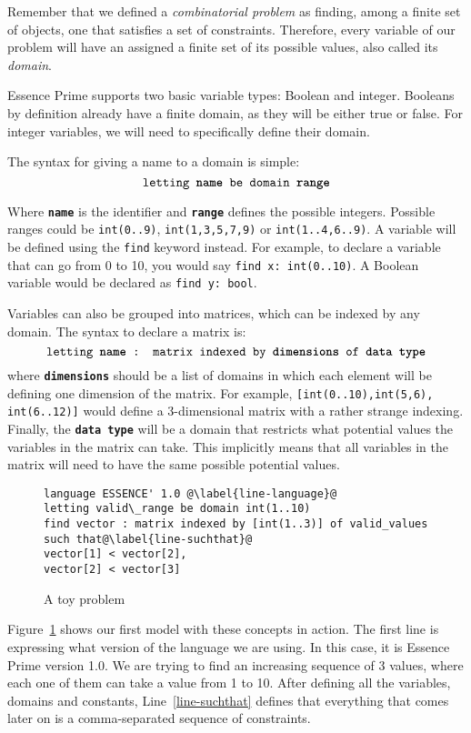 Remember that we defined a \emph{combinatorial problem} as finding, among a
finite set of objects, one that satisfies a set of constraints.  Therefore,
every variable of our problem will have an assigned a finite set
of its possible values, also called its \emph{domain}. 

Essence Prime supports two basic variable types: Boolean and integer. Booleans
by definition already have a finite domain, as they will be either true or false.
For integer variables, we will need to specifically define their domain.

The syntax for giving a name to a domain is simple:
$$\text{\texttt{letting \textbf{name} be domain \textbf{range}}}$$

Where \texttt{\textbf{name}} is the identifier and \texttt{\textbf{range}}
defines the possible integers. Possible ranges could be \texttt{int(0..9)},
\texttt{int(1,3,5,7,9)} or \texttt{int(1..4,6..9)}.  A variable will be defined
using the \texttt{find} keyword instead. For example, to declare a variable
that can go from 0 to 10, you would say \texttt{find x: int(0..10)}. A Boolean
variable would be declared as \texttt{find y: bool}.

Variables can also be grouped into matrices, which can be indexed by any domain.
The syntax to declare a matrix is:
$$\text{\texttt{letting \textbf{name} : matrix indexed by \textbf{dimensions} of \textbf{data type}}}$$
where \texttt{\textbf{dimensions}} should be a list of domains in which each
element will be defining one dimension of the matrix. For example,
\texttt{[int(0..10),int(5,6), int(6..12)]} would define a 3-dimensional matrix
with a rather strange indexing. Finally, the \texttt{\textbf{data type}} will
be a domain that restricts what potential values the variables in the matrix
can take.  This implicitly means that all variables in the matrix will need to
have the same possible potential values.

\begin{figure}
\begin{lstlisting}
language ESSENCE' 1.0 @\label{line-language}@
letting valid\_range be domain int(1..10)
find vector : matrix indexed by [int(1..3)] of valid_values
such that@\label{line-suchthat}@
vector[1] < vector[2],
vector[2] < vector[3]
\end{lstlisting}
    \caption{A toy problem}
\label{fig-toyexample}
\end{figure}

Figure~\ref{fig-toyexample} shows our first model with these concepts in
action.  The first line is expressing what version of the language we are
using.  In this case, it is Essence Prime version 1.0. We are trying to find an
increasing sequence of 3 values, where each one of them can take a value from 1
to 10. After defining all the variables, domains and constants,
Line~\ref{line-suchthat} defines that everything that comes later on is a
comma-separated sequence of constraints. 

